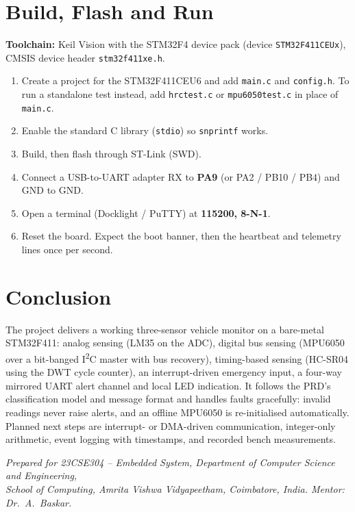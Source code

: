 \documentclass[11pt,a4paper]{article}
\newcommand{\ttu}{\textunderscore}
\begin{document}
\section{Build, Flash and Run}
\textbf{Toolchain:} Keil \textmu Vision with the STM32F4 device pack (device \texttt{STM32F411CEUx}), CMSIS device header \texttt{stm32f411xe.h}.
\begin{enumerate}
  \item Create a project for the STM32F411CEU6 and add \texttt{main.c} and \texttt{config.h}. To run a standalone test instead, add \texttt{hrc\ttu test.c} or \texttt{mpu6050\ttu test.c} in place of \texttt{main.c}.
  \item Enable the standard C library (\texttt{stdio}) so \texttt{snprintf} works.
  \item Build, then flash through ST-Link (SWD).
  \item Connect a USB-to-UART adapter RX to \textbf{PA9} (or PA2 / PB10 / PB4) and GND to GND.
  \item Open a terminal (Docklight / PuTTY) at \textbf{115200, 8-N-1}.
  \item Reset the board. Expect the boot banner, then the heartbeat and telemetry lines once per second.
\end{enumerate}

\section{Conclusion}
The project delivers a working three-sensor vehicle monitor on a bare-metal STM32F411: analog sensing (LM35 on the ADC), digital bus sensing (MPU6050 over a bit-banged I\textsuperscript{2}C master with bus recovery), timing-based sensing (HC-SR04 using the DWT cycle counter), an interrupt-driven emergency input, a four-way mirrored UART alert channel and local LED indication. It follows the PRD's classification model and message format and handles faults gracefully: invalid readings never raise alerts, and an offline MPU6050 is re-initialised automatically. Planned next steps are interrupt- or DMA-driven communication, integer-only arithmetic, event logging with timestamps, and recorded bench measurements.

\vfill
\begin{center}\small\itshape
Prepared for 23CSE304 -- Embedded System, Department of Computer Science and Engineering,\\
School of Computing, Amrita Vishwa Vidyapeetham, Coimbatore, India. Mentor: Dr.\ A.\ Baskar.
\end{center}
\end{document}
